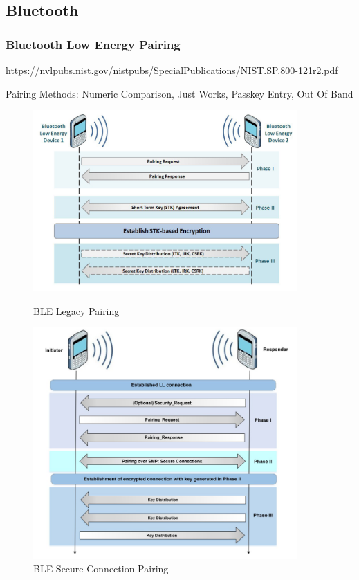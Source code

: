 \documentclass{ctexbeamer}
\begin{document}
\subsection{Bluetooth}
\begin{frame}
\frametitle{Bluetooth Low Energy Pairing}

https://nvlpubs.nist.gov/nistpubs/SpecialPublications/NIST.SP.800-121r2.pdf

Pairing Methods: Numeric Comparison, Just Works, Passkey Entry, Out Of Band

    \begin{figure}[htbp]
        \centering
        \begin{minipage}[t]{0.48\textwidth}
            \centering
            \includegraphics[width=0.9\textwidth]{pic/ble-legacy-pair.png}
            \caption{BLE Legacy Pairing}
        \end{minipage}
        \begin{minipage}[t]{0.48\textwidth}
            \centering
            \includegraphics[width=0.9\textwidth]{pic/ble-secure-connect-pair.png}
            \caption{BLE Secure Connection Pairing}
        \end{minipage}
    \end{figure}

\end{frame}
\end{document}
